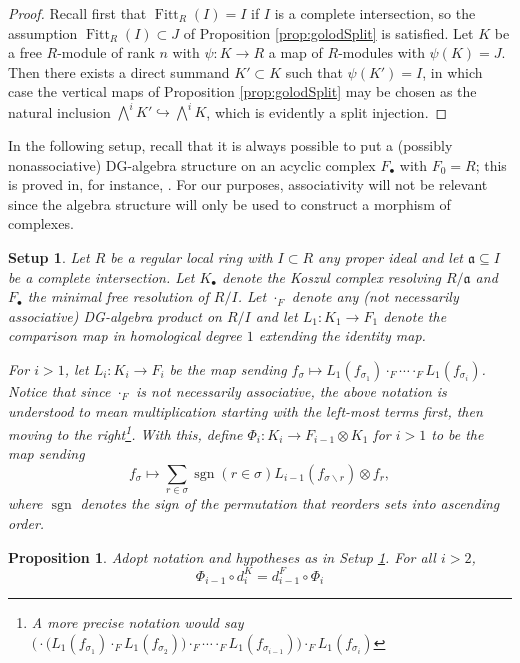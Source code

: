 \documentclass[10pt]{amsart}
\newtheorem{prop}[theorem]{Proposition}
\newtheorem{setup}[theorem]{Setup}
\theoremstyle{definition}
\theoremstyle{remark}
\newtheorem{the context}[theorem]{The Context}
\numberwithin{equation}{theorem}
\numberwithin{equation}{section}
\newcommand{\mfa}{\mathfrak{a}}
\newcommand{\fitt}{\operatorname{Fitt}}
\newcommand{\sgn}{\operatorname{sgn}}
\begin{document}
\begin{proof}
Recall first that $\fitt_R (I) = I$ if $I$ is a complete intersection, so the assumption $\fitt_R (I) \subset J$ of Proposition \ref{prop:golodSplit} is satisfied. Let $K$ be a free $R$-module of rank $n$ with $\psi : K \to R$ a map of $R$-modules with $\psi (K) = J$. Then there exists a direct summand $K' \subset K$ such that $\psi (K') = I$, in which case the vertical maps of Proposition \ref{prop:golodSplit} may be chosen as the natural inclusion $\bigwedge^i K' \hookrightarrow \bigwedge^i K$, which is evidently a split injection. 
\end{proof}



In the following setup, recall that it is always possible to put a (possibly nonassociative) DG-algebra structure on an acyclic complex $F_\bullet$ with $F_0 = R$; this is proved in, for instance, \cite[Proposition 1.1]{buchsbaum1977algebra}. For our purposes, associativity will not be relevant since the algebra structure will only be used to construct a morphism of complexes.

\begin{setup}\label{set:NonGOlodSet}
Let $R$ be a regular local ring with $I \subset R$ any proper ideal and let $\mfa \subseteq  I $ be a complete intersection. Let $K_\bullet$ denote the Koszul complex resolving $R/\mfa$ and $F_\bullet$ the minimal free resolution of $R/I$. Let $\cdot_F$ denote any (not necessarily associative) DG-algebra product on $R/I$ and let $L_1 : K_1 \to F_1$ denote the comparison map in homological degree $1$ extending the identity map. 

For $i>1$, let $L_i : K_i \to F_i$ be the map sending $f_{\sigma} \mapsto L_1(f_{\sigma_1}) \cdot_F \cdots \cdot_F L_1 (f_{\sigma_i})$. Notice that since $\cdot_F$ is not necessarily associative, the above notation is understood to mean multiplication starting with the left-most terms first, then moving to the right\footnote{A more precise notation would say $\Big( \cdot \big(L_1(f_{\sigma_1}) \cdot_F L_1 (f_{\sigma_2}) \big) \cdot_F \cdots \cdot_F L_1(f_{\sigma_{i-1}}) \Big) \cdot_F L_1 (f_{\sigma_i})$}. With this, define $\Phi_i : K_i \to F_{i-1} \otimes K_1$ for $i >1$ to be the map sending
$$f_{\sigma} \mapsto \sum_{r \in \sigma} \sgn(r \in \sigma) L_{i-1} (f_{\sigma \backslash r}) \otimes f_r,$$
where $\sgn$ denotes the sign of the permutation that reorders sets into ascending order.
\end{setup}

\begin{prop}
Adopt notation and hypotheses as in Setup \ref{set:NonGOlodSet}. For all $i >2$, 
$$\Phi_{i-1} \circ d^K_i = d^F_{i-1} \circ \Phi_i$$
\end{prop}
\end{document}
